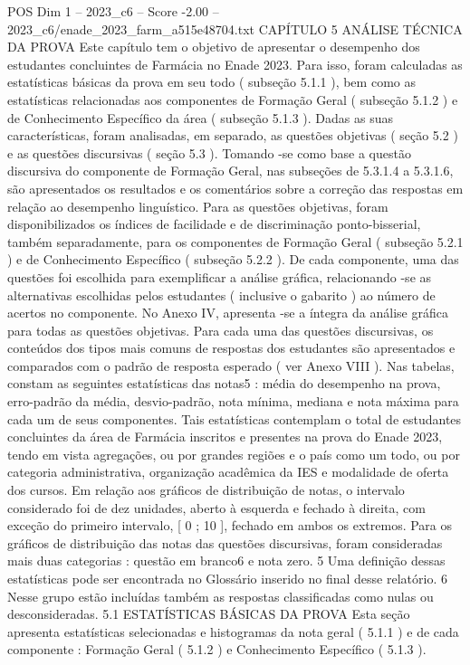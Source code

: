 \begin{textsample}{POS Dim 1 – 2023\_c6 – Score -2.00 – 2023\_c6/enade\_2023\_farm\_a515e48704.txt}  \label{ex:f1_pos_235}
CAPÍTULO 5 ANÁLISE TÉCNICA DA PROVA Este capítulo tem o objetivo de apresentar o desempenho dos estudantes concluintes de Farmácia no Enade 2023.
Para isso, foram calculadas as estatísticas básicas da prova em seu todo ( subseção 5.1.1 ), bem como as estatísticas relacionadas aos componentes de Formação Geral ( subseção 5.1.2 ) e de Conhecimento Específico da área ( subseção 5.1.3 ).
Dadas as suas características, foram analisadas, em separado, as questões objetivas ( seção 5.2 ) e as questões discursivas ( seção 5.3 ).
Tomando -se como base a questão discursiva do componente de Formação Geral, nas subseções de 5.3.1.4 a 5.3.1.6, são apresentados os resultados e os comentários sobre a correção das respostas em relação ao desempenho linguístico.
Para as questões objetivas, foram disponibilizados os índices de facilidade e de discriminação ponto-bisserial, também separadamente, para os componentes de Formação Geral ( subseção 5.2.1 ) e de Conhecimento Específico ( subseção 5.2.2 ).
De cada componente, uma das questões foi escolhida para exemplificar a análise gráfica, relacionando -se as alternativas escolhidas pelos estudantes ( inclusive o gabarito ) ao número de acertos no componente.
No Anexo IV, apresenta -se a íntegra da análise gráfica para todas as questões objetivas.
Para cada uma das questões discursivas, os conteúdos dos tipos mais comuns de respostas dos estudantes são apresentados e comparados com o padrão de resposta esperado ( ver Anexo VIII ).
Nas tabelas, constam as seguintes estatísticas das notas5 : média do desempenho na prova, erro-padrão da média, desvio-padrão, nota mínima, mediana e nota máxima para cada um de seus componentes.
Tais estatísticas contemplam o total de estudantes concluintes da área de Farmácia inscritos e presentes na prova do Enade 2023, tendo em vista agregações, ou por grandes regiões e o país como um todo, ou por categoria administrativa, organização acadêmica da IES e modalidade de oferta dos cursos.
Em relação aos gráficos de distribuição de notas, o intervalo considerado foi de dez unidades, aberto à esquerda e fechado à direita, com exceção do primeiro intervalo, [ 0 ; 10 ], fechado em ambos os extremos.
Para os gráficos de distribuição das notas das questões discursivas, foram consideradas mais duas categorias : questão em branco6 e nota zero. 5 Uma definição dessas estatísticas pode ser encontrada no Glossário inserido no final desse relatório. 6 Nesse grupo estão incluídas também as respostas classificadas como nulas ou desconsideradas. 5.1 ESTATÍSTICAS BÁSICAS DA PROVA Esta seção apresenta estatísticas selecionadas e histogramas da nota geral ( 5.1.1 ) e de cada componente : Formação Geral ( 5.1.2 ) e Conhecimento Específico ( 5.1.3 ).

\end{textsample}
